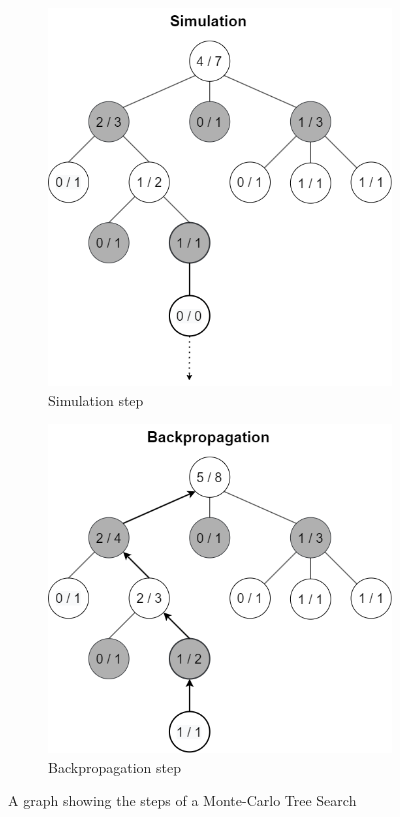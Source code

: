 \begin{figure}
\begin{subfigure}{.5\textwidth}
  \includegraphics[width=.8\linewidth]{figures/MCTS Simulation}
  \caption{Simulation step}
  \label{fig:MCTS Simulation}
\end{subfigure}%
\begin{subfigure}{.5\textwidth}
  \centering
  \includegraphics[width=.8\linewidth]{figures/MCTS Backpropagation}
  \caption{Backpropagation step}
  \label{fig:MCTS Backpropagation}
\end{subfigure}
\caption{A graph showing the steps of a Monte-Carlo Tree Search}
\label{fig:MCTS}
\end{figure}


